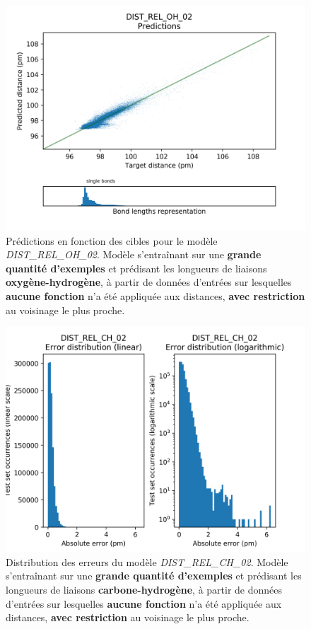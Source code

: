 \begin{figure}[!h]
	\centering
	
	\includegraphics[scale=0.75]{../figures/DIST_REL_OH_02/DIST_REL_OH_02_preds_targets.png}	
	
	\caption{Prédictions en fonction des cibles pour le modèle \emph{DIST\_REL\_OH\_02}. Modèle s'entraînant sur une \textbf{grande quantité d'exemples} et prédisant les longueurs de liaisons \textbf{oxygène-hydrogène}, à partir de données d'entrées sur lesquelles \textbf{aucune fonction} n'a été appliquée aux distances, \textbf{avec restriction} au voisinage le plus proche.}
	
\end{figure}
	
	

\begin{figure}[!h]
	\centering
	
	\includegraphics[scale=0.75]{../figures/DIST_REL_CH_02/DIST_REL_CH_02_distrib_rmse_val.png}	
	
	\caption{Distribution des erreurs du modèle \emph{DIST\_REL\_CH\_02}. Modèle s'entraînant sur une \textbf{grande quantité d'exemples} et prédisant les longueurs de liaisons \textbf{carbone-hydrogène}, à partir de données d'entrées sur lesquelles \textbf{aucune fonction} n'a été appliquée aux distances, \textbf{avec restriction} au voisinage le plus proche.}
\end{figure}

